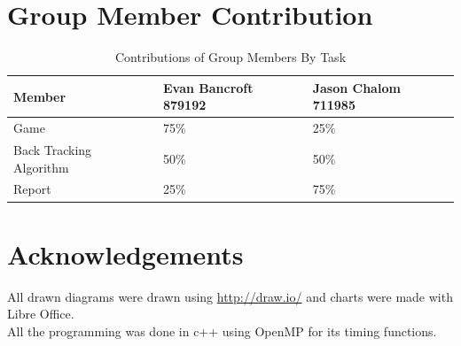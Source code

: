 \documentclass[a4paper]{article}
\begin{document}
\section{Group Member Contribution}
\begin{table}[H]
\centering
\label{contribution}
\begin{tabular}{|l|l|l|}
\hline
\textbf{Member}         & \textbf{Evan Bancroft 879192} & \textbf{Jason Chalom 711985} \\ \hline
Game                    & 75\%                          & 25\%                         \\ \hline
Back Tracking Algorithm & 50\%                          & 50\%                         \\ \hline
Report                  & 25\%                          & 75\%                         \\ \hline
\end{tabular}
\caption{Contributions of Group Members By Task}
\end{table}

\section*{Acknowledgements}
All drawn diagrams were drawn using \url{http://draw.io/} and charts were made with Libre Office.\\ 
All the programming was done in c++ using OpenMP for its timing functions.\\



{}
\end{document}
